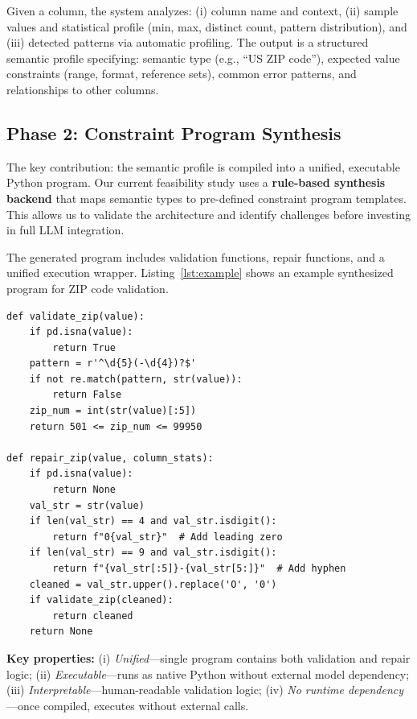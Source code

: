 \documentclass{article}
\begin{document}
Given a column, the system analyzes: (i) column name and context, (ii) sample values and statistical profile (min, max, distinct count, pattern distribution), and (iii) detected patterns via automatic profiling. The output is a structured semantic profile specifying: semantic type (e.g., ``US ZIP code''), expected value constraints (range, format, reference sets), common error patterns, and relationships to other columns.

\subsection{Phase 2: Constraint Program Synthesis}
\label{sec:synthesis}

The key contribution: the semantic profile is compiled into a unified, executable Python program. Our current feasibility study uses a \textbf{rule-based synthesis backend} that maps semantic types to pre-defined constraint program templates. This allows us to validate the architecture and identify challenges before investing in full LLM integration.

The generated program includes validation functions, repair functions, and a unified execution wrapper. Listing~\ref{lst:example} shows an example synthesized program for ZIP code validation.

\begin{lstlisting}[caption={Example synthesized constraint program for ZIP code validation and repair.},label={lst:example},float=t]
def validate_zip(value):
    if pd.isna(value):
        return True
    pattern = r'^\d{5}(-\d{4})?$'
    if not re.match(pattern, str(value)):
        return False
    zip_num = int(str(value)[:5])
    return 501 <= zip_num <= 99950

def repair_zip(value, column_stats):
    if pd.isna(value):
        return None
    val_str = str(value)
    if len(val_str) == 4 and val_str.isdigit():
        return f"0{val_str}"  # Add leading zero
    if len(val_str) == 9 and val_str.isdigit():
        return f"{val_str[:5]}-{val_str[5:]}"  # Add hyphen
    cleaned = val_str.upper().replace('O', '0')
    if validate_zip(cleaned):
        return cleaned
    return None
\end{lstlisting}

\textbf{Key properties:} (i) \textit{Unified}---single program contains both validation and repair logic; (ii) \textit{Executable}---runs as native Python without external model dependency; (iii) \textit{Interpretable}---human-readable validation logic; (iv) \textit{No runtime dependency}---once compiled, executes without external calls.
\end{document}
